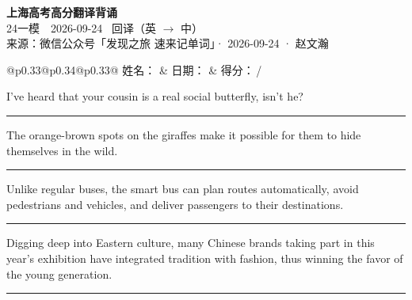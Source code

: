 \documentclass[11pt,a4paper]{article}
\newcommand{\num}[1]{\makebox[1.9em][r]{#1.}\hspace{0.3em}}
\newcommand{\wline}{\noindent\rule{\linewidth}{0.4pt}}
\begin{document}
\pagestyle{plain}
\begin{center}
{\LARGE\bfseries 上海高考高分翻译背诵 }\\[0.25em]
{\large 24一模　2026-09-24 \quad\ 回译（英 $\to$ 中）}\\[0.35em]
{\footnotesize 来源：微信公众号「发现之旅 速来记单词」· 2026-09-24 · 赵文瀚}
\end{center}

\vspace{0.4em}
\noindent\begin{tabular}{@{}p{0.33\textwidth}@{}p{0.34\textwidth}@{}p{0.33\textwidth}@{}}
姓名：\underline{\hspace{2.0cm}} & 日期：\underline{\hspace{2.0cm}} & 得分：\underline{\hspace{1.4cm}}\,/ \\
\end{tabular}

\vspace{0.5em}

\vspace{0.8em}
\num{1}I’ve heard that your cousin is a real social butterfly, isn’t he?

\vspace{0.25em}

\wline

\num{2}The orange-brown spots on the giraffes make it possible for them to hide themselves in the wild.

\vspace{0.25em}

\wline

\num{3}Unlike regular buses, the smart bus can plan routes automatically, avoid pedestrians and vehicles, and deliver passengers to their destinations.

\vspace{0.25em}

\wline

\num{4}Digging deep into Eastern culture, many Chinese brands taking part in this year’s exhibition have integrated tradition with fashion, thus winning the favor of the young generation.

\vspace{0.25em}

\wline
\end{document}
